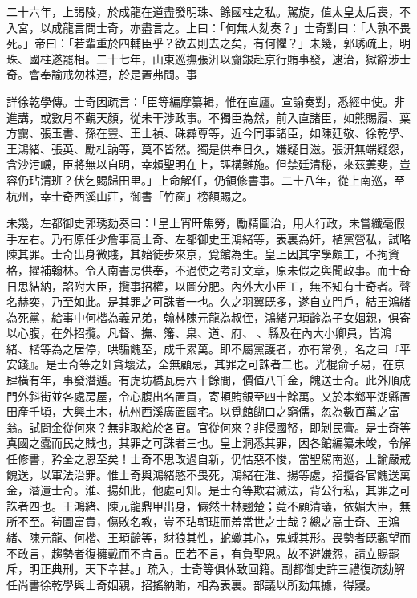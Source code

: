\begin{pinyinscope}
二十六年，上謁陵，於成龍在道盡發明珠、餘國柱之私。駕旋，值太皇太后喪，不入宮，以成龍言問士奇，亦盡言之。上曰：「何無人劾奏？」士奇對曰：「人孰不畏死。」帝曰：「若輩重於四輔臣乎？欲去則去之矣，有何懼？」未幾，郭琇疏上，明珠、國柱遂罷相。二十七年，山東巡撫張汧以齎銀赴京行賄事發，逮治，獄辭涉士奇。會奉諭戒勿株連，於是置弗問。事

詳徐乾學傳。士奇因疏言：「臣等編摩纂輯，惟在直廬。宣諭奏對，悉經中使。非進講，或數月不覲天顏，從未干涉政事。不獨臣為然，前入直諸臣，如熊賜履、葉方靄、張玉書、孫在豐、王士禎、硃彞尊等，近今同事諸臣，如陳廷敬、徐乾學、王鴻緒、張英、勵杜訥等，莫不皆然。獨是供奉日久，嫌疑日滋。張汧無端疑怨，含沙污衊，臣將無以自明，幸賴聖明在上，誣構難施。但禁廷清秘，來茲萋斐，豈容仍玷清班？伏乞賜歸田里。」上命解任，仍領修書事。二十八年，從上南巡，至杭州，幸士奇西溪山莊，御書「竹窗」榜額賜之。

未幾，左都御史郭琇劾奏曰：「皇上宵旰焦勞，勵精圖治，用人行政，未嘗纖毫假手左右。乃有原任少詹事高士奇、左都御史王鴻緒等，表裏為奸，植黨營私，試略陳其罪。士奇出身微賤，其始徒步來京，覓館為生。皇上因其字學頗工，不拘資格，擢補翰林。令入南書房供奉，不過使之考訂文章，原未假之與聞政事。而士奇日思結納，諂附大臣，攬事招權，以圖分肥。內外大小臣工，無不知有士奇者。聲名赫奕，乃至如此。是其罪之可誅者一也。久之羽翼既多，遂自立門戶，結王鴻緒為死黨，給事中何楷為義兄弟，翰林陳元龍為叔侄，鴻緒兄頊齡為子女姻親，俱寄以心腹，在外招攬。凡督、撫、籓、臬、道、府、、縣及在內大小卿員，皆鴻緒、楷等為之居停，哄騙餽至，成千累萬。即不屬黨護者，亦有常例，名之曰『平安錢』。是士奇等之奸貪壞法，全無顧忌，其罪之可誅者二也。光棍俞子易，在京肆橫有年，事發潛遁。有虎坊橋瓦房六十餘間，價值八千金，餽送士奇。此外順成門外斜街並各處房屋，令心腹出名置買，寄頓賄銀至四十餘萬。又於本鄉平湖縣置田產千頃，大興土木，杭州西溪廣置園宅。以覓館餬口之窮儒，忽為數百萬之富翁。試問金從何來？無非取給於各官。官從何來？非侵國帑，即剝民膏。是士奇等真國之蠹而民之賊也，其罪之可誅者三也。皇上洞悉其罪，因各館編纂未竣，令解任修書，矜全之恩至矣！士奇不思改過自新，仍怙惡不悛，當聖駕南巡，上諭嚴戒餽送，以軍法治罪。惟士奇與鴻緒愍不畏死，鴻緒在淮、揚等處，招攬各官餽送萬金，潛遺士奇。淮、揚如此，他處可知。是士奇等欺君滅法，背公行私，其罪之可誅者四也。王鴻緒、陳元龍鼎甲出身，儼然士林翹楚；竟不顧清議，依媚大臣，無所不至。茍圖富貴，傷敗名教，豈不玷朝班而羞當世之士哉？總之高士奇、王鴻緒、陳元龍、何楷、王頊齡等，豺狼其性，蛇蠍其心，鬼蜮其形。畏勢者既觀望而不敢言，趨勢者復擁戴而不肯言。臣若不言，有負聖恩。故不避嫌怨，請立賜罷斥，明正典刑，天下幸甚。」疏入，士奇等俱休致回籍。副都御史許三禮復疏劾解任尚書徐乾學與士奇姻親，招搖納賄，相為表裏。部議以所劾無據，得寢。


\end{pinyinscope}
